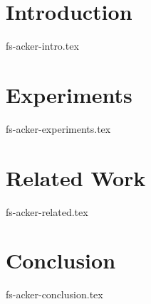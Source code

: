 \documentclass[sigconf]{acmart}
\theoremstyle{remark}
\begin{document}

\maketitle

\thispagestyle{empty}

\section {Introduction}
 {fs-acker-intro.tex}

\section {Experiments}
 {fs-acker-experiments.tex}

\section{Related Work}
 {fs-acker-related.tex}


\section {Conclusion}
 {fs-acker-conclusion.tex}



\end{document}
